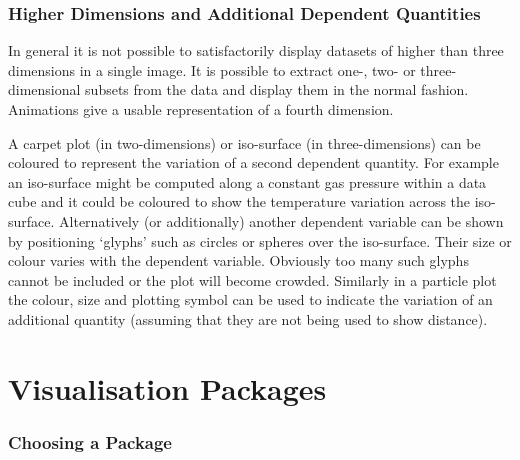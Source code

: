 \section{Higher Dimensions and Additional Dependent Quantities
 }

In general it is not possible to satisfactorily display datasets of 
higher than three dimensions in a single image. It is possible to extract
one-, two- or three-dimensional subsets from the data and display them in
the normal fashion. Animations give a usable representation of a fourth
dimension.

A carpet plot (in two-dimensions) or iso-surface (in three-dimensions)
can be coloured to represent the variation of a second dependent
quantity. For example an iso-surface might be computed along a constant
gas pressure within a data cube and it could be coloured to show the
temperature variation across the iso-surface. Alternatively (or
additionally) another dependent variable can be shown by positioning
`glyphs' such as circles or spheres over the iso-surface. Their size
or colour varies with the dependent variable. Obviously too many such
glyphs cannot be included or the plot will become crowded. Similarly in a
particle plot the colour, size and plotting symbol can be used to indicate
the variation of an additional quantity (assuming that they are not being
used to show distance).


\pagebreak
\markboth{\stardocname}{\stardocname}
\part{Visualisation Packages}
\markboth{\stardocname}{\stardocname}

\section{Choosing a Package  }

